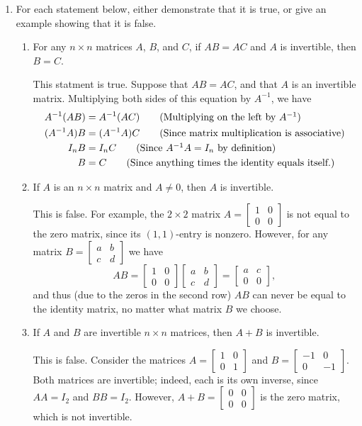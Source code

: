 \documentclass[letterpaper,12pt,reqno]{amsart}
\newcommand{\bbm}{\begin{bmatrix}}
\newcommand{\ebm}{\end{bmatrix}}
\begin{document}
\begin{enumerate}
\pagebreak


\item For each statement below, either demonstrate that it is true, or give an example showing that it is false.

\medskip


\begin{enumerate}
 \item For any $n\times n$ matrices $A$, $B$, and $C$, if $AB=AC$ and $A$ is invertible, then $B=C$.

\bigskip

This statment is true. Suppose that $AB=AC$, and that $A$ is an invertible matrix. Multiplying both sides of this equation by $A^{-1}$, we have
\begin{align*}
 A^{-1}(AB) &= A^{-1}(AC)\tag{Multiplying on the left by $A^{-1}$}\\
 (A^{-1}A)B &= (A^{-1}A)C\tag{Since matrix multiplication is associative}\\
 I_nB & = I_nC\tag{Since $A^{-1}A=I_n$ by definition}\\
 B&=C \tag{Since anything times the identity equals itself.}
\end{align*}

\bigskip

 \item If $A$ is an $n\times n$ matrix and $A\neq 0$, then $A$ is invertible.

\bigskip

This is false. For example, the $2\times 2$ matrix $A = \bbm 1&0\\0&0\ebm$ is not equal to the zero matrix, since its $(1,1)$-entry is nonzero. However, for any matrix $B=\bbm a&b\\c&d\ebm$ we have
\[
 AB = \bbm 1&0\\0&0\ebm\bbm a&b\\c&d\ebm = \bbm a&c\\0&0\ebm,
\]
and thus (due to the zeros in the second row) $AB$ can never be equal to the identity matrix, no matter what matrix $B$ we choose.

\bigskip

 \item If $A$ and $B$ are invertible $n\times n$ matrices, then $A+B$ is invertible.

\bigskip

This is false. Consider the matrices $A = \bbm 1&0\\0&1\ebm$ and $B = \bbm -1&0\\0&-1\ebm$. Both matrices are invertible; indeed, each is its own inverse, since
$AA=I_2$ and $BB=I_2$. However, $A+B = \bbm 0&0\\0&0\ebm$ is the zero matrix, which is not invertible.


\end{enumerate}
\end{enumerate}
\end{document}
